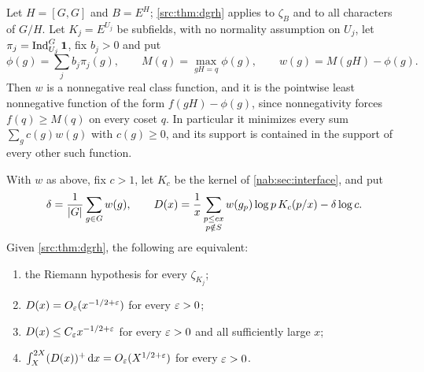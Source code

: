 Let $H=[G,G]$ and $B=E^H$; \cref{src:thm:dgrh} applies to $\zeta_B$ and to all characters
of $G/H$. Let $K_j=E^{U_j}$ be subfields, with no normality assumption on $U_j$, let
$\pi_j=\operatorname{Ind}_{U_j}^G\mathbf{1}$, fix $b_j>0$ and put
\[
 \phi(g)=\sum_jb_j\pi_j(g),\qquad M(q)=\max_{gH=q}\phi(g),\qquad w(g)=M(gH)-\phi(g).
\]
Then $w$ is a nonnegative real class function, and it is the pointwise least nonnegative
function of the form $f(gH)-\phi(g)$, since nonnegativity forces $f(q)\ge M(q)$ on every
coset $q$. In particular it minimizes every sum $\sum_gc(g)w(g)$ with $c(g)\ge0$, and its
support is contained in the support of every other such function.

\begin{theorem}\label{nab:thm:deficit}
With $w$ as above, fix $c>1$, let $K_c$ be the kernel of \cref{nab:sec:interface}, and
put
\[
 \delta=\frac1{\lvert G\rvert}\sum_{g\in G}w(g),\qquad
 D(x)=\frac1x\sum_{\substack{p\le cx\\p\notin S}}w(g_p)\log p\,K_c(p/x)-\delta\log c .
\]
Given \cref{src:thm:dgrh}, the following are equivalent:
\begin{enumerate}[label=\textup{(\roman*)}]
\item the Riemann hypothesis for every $\zeta_{K_j}$;
\item $D(x)=O_\varepsilon(x^{-1/2+\varepsilon})$ for every $\varepsilon>0$;
\item $D(x)\le C_\varepsilon x^{-1/2+\varepsilon}$ for every $\varepsilon>0$ and all sufficiently large $x$;
\item $\int_X^{2X}(D(x))^{+}\,\mathrm{d} x=O_\varepsilon(X^{1/2+\varepsilon})$ for every $\varepsilon>0$.
\end{enumerate}
\end{theorem}
